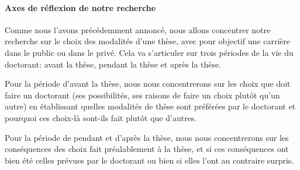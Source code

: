 \documentclass[12pt]{article}
\begin{document}


\paragraph{Axes de réflexion de notre recherche}

Comme nous l'avons précédemment annoncé, nous allons concentrer notre recherche sur le choix des modalités d'une thèse, avec pour objectif une carrière dans le public ou dans le privé. Cela va s'articuler sur trois périodes de la vie du doctorant: avant la thèse, pendant la thèse et après la thèse.

Pour la période d'avant la thèse, nous nous concentrerons sur les choix que doit faire un doctorant (ses possibilités, ses raisons de faire un choix plutôt qu'un autre) en établissant quelles modalités de thèse sont préférées par le doctorant et pourquoi ces choix-là sont-ils fait plutôt que d'autres.


Pour la période de pendant et d'après la thèse, nous nous concentrerons sur les conséquences des choix fait préalablement à la thèse, et si ces conséquences ont bien été celles prévues par le doctorant ou bien si elles l'ont au contraire surpris.




\end{document}

